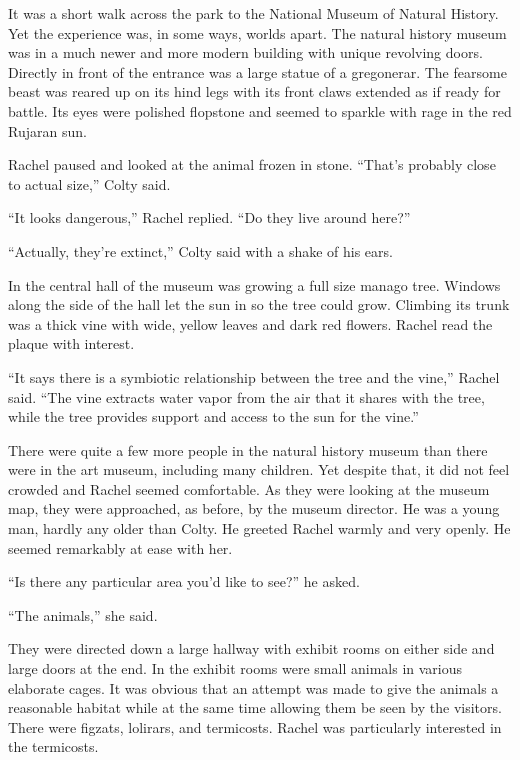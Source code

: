 

It was a short walk across the park to the National Museum of Natural History. Yet the
experience was, in some ways, worlds apart. The natural history museum was in a much newer and
more modern building with unique revolving doors. Directly in front of the entrance was a large
statue of a gregonerar. The fearsome beast was reared up on its hind legs with its front claws
extended as if ready for battle. Its eyes were polished flopstone and seemed to sparkle with
rage in the red Rujaran sun.

Rachel paused and looked at the animal frozen in stone. ``That's probably close to actual
size,'' Colty said.

``It looks dangerous,'' Rachel replied. ``Do they live around here?''

``Actually, they're extinct,'' Colty said with a shake of his ears.

In the central hall of the museum was growing a full size manago tree. Windows along the side of
the hall let the sun in so the tree could grow. Climbing its trunk was a thick vine with wide,
yellow leaves and dark red flowers. Rachel read the plaque with interest.

``It says there is a symbiotic relationship between the tree and the vine,'' Rachel said. ``The
vine extracts water vapor from the air that it shares with the tree, while the tree provides
support and access to the sun for the vine.''

There were quite a few more people in the natural history museum than there were in the art
museum, including many children. Yet despite that, it did not feel crowded and Rachel seemed
comfortable. As they were looking at the museum map, they were approached, as before, by the
museum director. He was a young man, hardly any older than Colty. He greeted Rachel warmly and
very openly. He seemed remarkably at ease with her.

``Is there any particular area you'd like to see?'' he asked.

``The animals,'' she said.

They were directed down a large hallway with exhibit rooms on either side and large doors at the
end. In the exhibit rooms were small animals in various elaborate cages. It was obvious that an
attempt was made to give the animals a reasonable habitat while at the same time allowing them
be seen by the visitors. There were figzats, lolirars, and termicosts. Rachel was particularly
interested in the termicosts.

